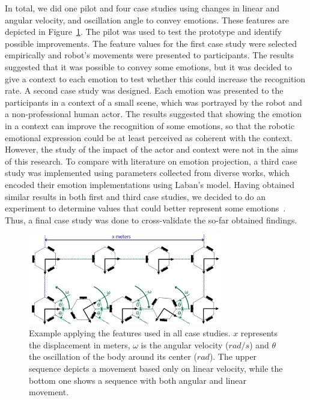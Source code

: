 In total, we did one pilot and four case studies using changes in linear and angular velocity, and oscillation angle to convey emotions. These features are depicted in Figure~\ref{fig:features}. The pilot was used to test the prototype and identify possible improvements. The feature values for the first case study were selected empirically and robot's movements were presented to participants. The results suggested that it was possible to convey some emotions, but it was decided to give a context to each emotion to test whether this could increase the recognition rate. A second case study was designed. Each emotion was presented to the participants in a context of a small scene, which was portrayed by the robot and a non-professional human actor. The results suggested that showing the emotion in a context can improve the recognition of some emotions, so that the robotic emotional expression could be at least perceived as coherent with the context. However, the study of the impact of the actor and context were not in the aims of this research. To compare with literature on emotion projection, a third case study was implemented using parameters collected from diverse works, which encoded their emotion implementations using Laban's model. Having obtained similar results in both first and third case studies, we decided to do an experiment to determine values that could better represent some emotions~\cite{Angel2017}. Thus, a final case study was done to cross-validate the so-far obtained findings.

\begin{figure}[h]
	\centering
	\includegraphics[width=0.75\textwidth]{./Images/ExampleMovement.png}
	\caption{Example applying the features used in all case studies. $x$ represents the displacement in meters, $\omega$ is the angular velocity ($rad/s$) and $\theta$ the oscillation of the body around its center ($rad$). The upper sequence depicts a movement based only on linear velocity, while the bottom one shows a sequence with both angular and linear movement.}
	\label{fig:features}
\end{figure} 


